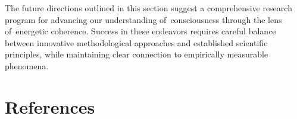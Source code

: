 \begin{refsection}
    The future directions outlined in this section suggest a comprehensive research program for advancing our understanding of~consciousness through the lens of~energetic coherence. Success in these endeavors requires careful balance between innovative methodological approaches and established scientific principles, while maintaining clear connection to empirically measurable phenomena.

    

    

    

    

    

    

    \newpage
    \section{References}
    \printbibliography[title={},heading=subbibliography]
\end{refsection}